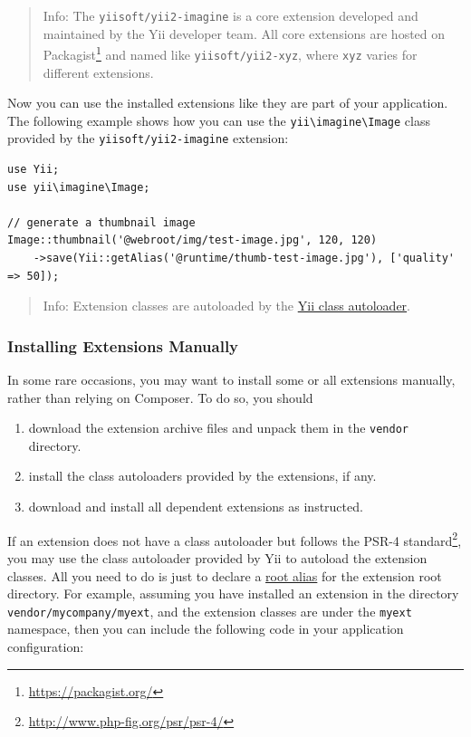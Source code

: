 \begin{quote}Info: The \lstinline|yiisoft/yii2-imagine| is a core extension developed and maintained by the Yii developer team. All
  core extensions are hosted on Packagist\footnote{\url{https://packagist.org/}} and named like \lstinline|yiisoft/yii2-xyz|, where \lstinline|xyz|
  varies for different extensions.

\end{quote}
Now you can use the installed extensions like they are part of your application. The following example shows
how you can use the \lstinline|yii\imagine\Image| class provided by the \lstinline|yiisoft/yii2-imagine| extension:

\lstset{language=php}\begin{lstlisting}
use Yii;
use yii\imagine\Image;

// generate a thumbnail image
Image::thumbnail('@webroot/img/test-image.jpg', 120, 120)
    ->save(Yii::getAlias('@runtime/thumb-test-image.jpg'), ['quality' => 50]);
\end{lstlisting}
\begin{quote}Info: Extension classes are autoloaded by the \hyperref[concept-autoloading.md]{Yii class autoloader}.

\end{quote}
\subsubsection{Installing Extensions Manually \label{structure-extensions.md::installing-extensions-manually}}
In some rare occasions, you may want to install some or all extensions manually, rather than relying on Composer.
To do so, you should

\begin{enumerate}
\item download the extension archive files and unpack them in the \lstinline|vendor| directory.
\item install the class autoloaders provided by the extensions, if any.
\item download and install all dependent extensions as instructed.
\end{enumerate}
If an extension does not have a class autoloader but follows the PSR-4 standard\footnote{\url{http://www.php-fig.org/psr/psr-4/}},
you may use the class autoloader provided by Yii to autoload the extension classes. All you need to do is just to
declare a \hyperref[concept-aliases.md::defining-aliases]{root alias} for the extension root directory. For example,
assuming you have installed an extension in the directory \lstinline|vendor/mycompany/myext|, and the extension classes
are under the \lstinline|myext| namespace, then you can include the following code in your application configuration:

